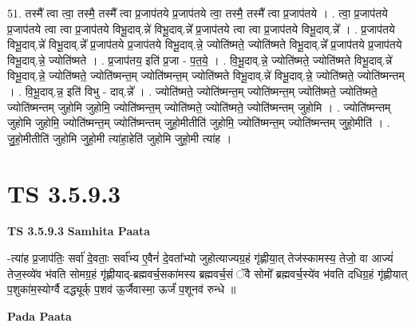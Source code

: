 \documentclass[17pt]{extarticle}
\begin{document}
51. तस्मै᳚ त्वा त्वा॒ तस्मै॒ तस्मै᳚ त्वा प्र॒जाप॑तये प्र॒जाप॑तये त्वा॒ तस्मै॒ तस्मै᳚ त्वा प्र॒जाप॑तये । . त्वा॒ प्र॒जाप॑तये प्र॒जाप॑तये त्वा त्वा प्र॒जाप॑तये विभू॒दाव्.न्ने॑ विभू॒दाव्.न्ने᳚ प्र॒जाप॑तये त्वा त्वा प्र॒जाप॑तये विभू॒दाव्.न्ने᳚ । . प्र॒जाप॑तये विभू॒दाव्.न्ने॑ विभू॒दाव्.न्ने᳚ प्र॒जाप॑तये प्र॒जाप॑तये विभू॒दाव्.न्ने॒ ज्योति॑ष्मते॒ ज्योति॑ष्मते विभू॒दाव्.न्ने᳚ प्र॒जाप॑तये प्र॒जाप॑तये विभू॒दाव्.न्ने॒ ज्योति॑ष्मते । . प्र॒जाप॑तय॒ इति॑ प्र॒जा - प॒त॒ये॒ । . वि॒भू॒दाव्.न्ने॒ ज्योति॑ष्मते॒ ज्योति॑ष्मते विभू॒दाव्.न्ने॑ विभू॒दाव्.न्ने॒ ज्योति॑ष्मते॒ ज्योति॑ष्मन्त॒म् ज्योति॑ष्मन्त॒म् ज्योति॑ष्मते विभू॒दाव्.न्ने॑ विभू॒दाव्.न्ने॒ ज्योति॑ष्मते॒ ज्योति॑ष्मन्तम् । . वि॒भू॒दाव्.न्न॒ इति॑ विभु - दाव्.न्ने᳚ । . ज्योति॑ष्मते॒ ज्योति॑ष्मन्त॒म् ज्योति॑ष्मन्त॒म् ज्योति॑ष्मते॒ ज्योति॑ष्मते॒ ज्योति॑ष्मन्तम् जुहोमि जुहोमि॒ ज्योति॑ष्मन्त॒म् ज्योति॑ष्मते॒ ज्योति॑ष्मते॒ ज्योति॑ष्मन्तम् जुहोमि । . ज्योति॑ष्मन्तम् जुहोमि जुहोमि॒ ज्योति॑ष्मन्त॒म् ज्योति॑ष्मन्तम् जुहो॒मीतीति॑ जुहोमि॒ ज्योति॑ष्मन्त॒म् ज्योति॑ष्मन्तम् जुहो॒मीति॑ । . जु॒हो॒मीतीति॑ जुहोमि जुहो॒मी त्या॑हा॒हेति॑ जुहोमि जुहो॒मी त्या॑ह । \newline
\pagebreak
{}

\section{ TS 3.5.9.3 }

\textbf{TS 3.5.9.3 } \newline
\textbf{Samhita Paata} \newline

-त्या॑ह प्र॒जाप॑तिः॒ सर्वा॑ दे॒वताः॒ सर्वा᳚भ्य ए॒वैनं॑ दे॒वता᳚भ्यो जुहोत्याज्यग्र॒हं गृ॑ह्णीया॒त् तेज॑स्कामस्य॒ तेजो॒ वा आज्यं॑ तेज॒स्व्ये॑व भ॑वति सोमग्र॒हं गृ॑ह्णीयाद्-ब्रह्मवर्च॒सका॑मस्य ब्रह्मवर्च॒सं ॅवै सोमो᳚ ब्रह्मवर्च॒स्ये॑व भ॑वति दधिग्र॒हं गृ॑ह्णीयात् प॒शुका॑म॒स्योर्ग्वै दद्ध्यूर्क् प॒शव॑ ऊ॒र्जैवास्मा॒ ऊर्जं॑ प॒शूनव॑ रुन्धे ॥ \newline

\textbf{Pada Paata} \newline
\end{document}
